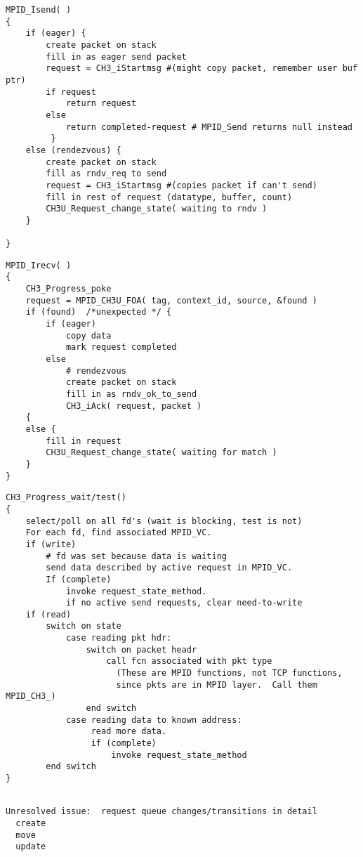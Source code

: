 \documentclass{article}
\begin{document}
\begin{verbatim}
MPID_Isend( )
{
    if (eager) {
        create packet on stack
        fill in as eager send packet
        request = CH3_iStartmsg #(might copy packet, remember user buf ptr)
        if request
            return request
        else 
            return completed-request # MPID_Send returns null instead
         }
    else (rendezvous) {
        create packet on stack
        fill as rndv_req to send
        request = CH3_iStartmsg #(copies packet if can't send)
        fill in rest of request (datatype, buffer, count)
        CH3U_Request_change_state( waiting to rndv )
    } 

}
\end{verbatim}

\begin{verbatim}
MPID_Irecv( )
{
    CH3_Progress_poke
    request = MPID_CH3U_FOA( tag, context_id, source, &found )
    if (found)  /*unexpected */ {
        if (eager)
            copy data
            mark request completed
        else
            # rendezvous
            create packet on stack
            fill in as rndv_ok_to_send
            CH3_iAck( request, packet )
    {
    else {
        fill in request
        CH3U_Request_change_state( waiting for match )
    }
}
\end{verbatim}

\begin{verbatim}
CH3_Progress_wait/test()
{
    select/poll on all fd's (wait is blocking, test is not)
    For each fd, find associated MPID_VC.
    if (write)
        # fd was set because data is waiting
        send data described by active request in MPID_VC.  
        If (complete)
            invoke request_state_method.
            if no active send requests, clear need-to-write
    if (read)
        switch on state
            case reading pkt hdr: 
                switch on packet headr
                    call fcn associated with pkt type
                      (These are MPID functions, not TCP functions, 
                      since pkts are in MPID layer.  Call them MPID_CH3_) 
                end switch
            case reading data to known address:
                 read more data.
                 if (complete)
                     invoke request_state_method
        end switch
}
\end{verbatim}

\begin{verbatim}

Unresolved issue:  request queue changes/transitions in detail
  create
  move
  update
\end{verbatim}
\end{document}
